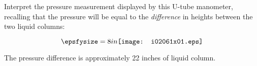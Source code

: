 


Interpret the pressure measurement displayed by this U-tube manometer, recalling that the pressure will be equal to the {\it difference} in heights between the two liquid columns:

$$\epsfysize=8in \texttt{[image: i02061x01.eps]}$$








The pressure difference is approximately 22 inches of liquid column.











